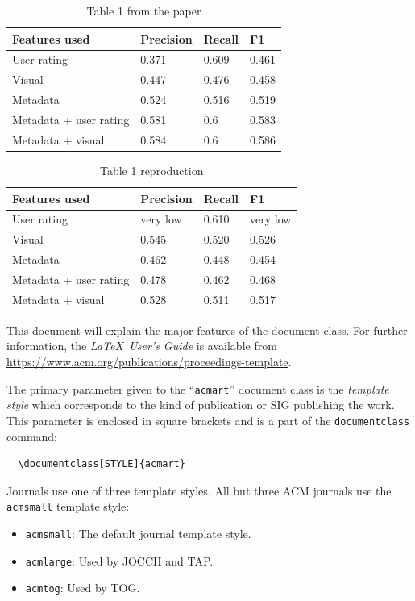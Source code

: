\documentclass[sigconf]{acmart}
\begin{document}
\begin{table}[]
  \caption*{Table 1 from the paper}
\begin{tabular}{llll}
\hline
Features used          & Precision & Recall & F1    \\ \hline
User rating            & 0.371     & 0.609  & 0.461 \\
Visual                 & 0.447     & 0.476  & 0.458 \\
Metadata               & 0.524     & 0.516  & 0.519 \\
Metadata + user rating & 0.581     & 0.6    & 0.583 \\
Metadata + visual      & 0.584     & 0.6    & 0.586 \\ \hline
\end{tabular}
\end{table}

\begin{table}[]
  \caption*{Table 1 reproduction}
\begin{tabular}{llll}
\hline
Features used          & Precision & Recall & F1       \\ \hline
User rating            & very low  & 0.610  & very low \\
Visual                 & 0.545     & 0.520  & 0.526    \\
Metadata               & 0.462     & 0.448  & 0.454    \\
Metadata + user rating & 0.478     & 0.462  & 0.468    \\
Metadata + visual      & 0.528     & 0.511  & 0.517    \\ \hline
\end{tabular}
\end{table}

This document will explain the major features of the document
class. For further information, the {\itshape \LaTeX\ User's Guide} is
available from
\url{https://www.acm.org/publications/proceedings-template}.

The primary parameter given to the ``\verb|acmart|'' document class is
the {\itshape template style} which corresponds to the kind of publication
or SIG publishing the work. This parameter is enclosed in square
brackets and is a part of the {\verb|documentclass|} command:
\begin{verbatim}
  \documentclass[STYLE]{acmart}
\end{verbatim}

Journals use one of three template styles. All but three ACM journals
use the {\verb|acmsmall|} template style:
\begin{itemize}
\item {\verb|acmsmall|}: The default journal template style.
\item {\verb|acmlarge|}: Used by JOCCH and TAP.
\item {\verb|acmtog|}: Used by TOG.
\end{itemize}
\end{document}
